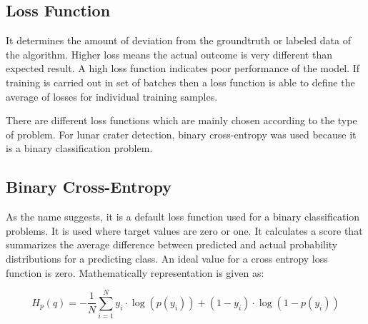 \documentclass[11pt]{article}
\begin{document}

\subsection{Loss Function}
It determines the amount of deviation from the groundtruth or labeled data of the algorithm. Higher loss means the actual outcome is very different than expected result. A high loss function indicates poor performance of the model. If training is carried out in set of batches then a loss function is able to define the average of losses for individual training samples. 

There are different loss functions which are mainly chosen according to the type of problem. For lunar crater detection, binary cross-entropy was used because it is a binary classification problem.

\subsection{Binary Cross-Entropy}
As the name suggests, it is a default loss function used for a binary classification problems. It is used where target values are zero or one. It calculates a score that summarizes the average difference between predicted and actual probability distributions for a predicting class. An ideal value for a cross entropy loss function is zero. Mathematically representation is given as:

\begin{equation}
H_{p}(q)=-\frac{1}{N} \sum_{i=1}^{N} y_{i} \cdot \log \left(p\left(y_{i}\right)\right)+\left(1-y_{i}\right) \cdot \log \left(1-p\left(y_{i}\right)\right)
\label{bce}
\end{equation}
\end{document}
